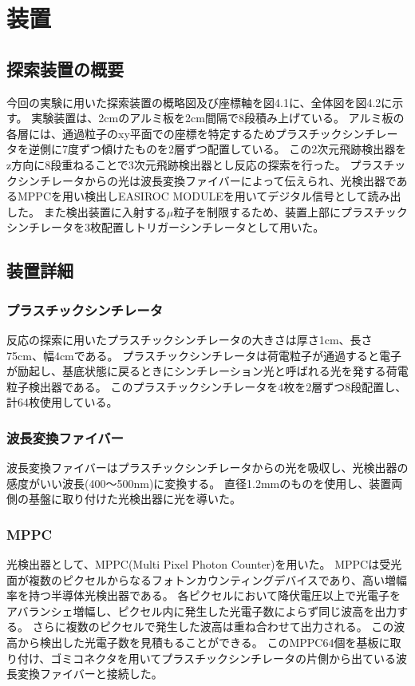 \chapter{装置} \label{equipment}
\section{探索装置の概要}
今回の実験に用いた探索装置の概略図及び座標軸を図4.1に、全体図を図4.2に示す。
実験装置は、2cmのアルミ板を2cm間隔で8段積み上げている。
アルミ板の各層には、通過粒子のxy平面での座標を特定するためプラスチックシンチレータを逆側に7度ずつ傾けたものを2層ずつ配置している。
この2次元飛跡検出器をz方向に8段重ねることで3次元飛跡検出器とし反応の探索を行った。
プラスチックシンチレータからの光は波長変換ファイバーによって伝えられ、光検出器であるMPPCを用い検出しEASIROC MODULEを用いてデジタル信号として読み出した。
また検出装置に入射する$\mu$粒子を制限するため、装置上部にプラスチックシンチレータを3枚配置しトリガーシンチレータとして用いた。

\section{装置詳細}
\subsection{プラスチックシンチレータ}
反応の探索に用いたプラスチックシンチレータの大きさは厚さ1cm、長さ75cm、幅4cmである。
プラスチックシンチレータは荷電粒子が通過すると電子が励起し、基底状態に戻るときにシンチレーション光と呼ばれる光を発する荷電粒子検出器である。
このプラスチックシンチレータを4枚を2層ずつ8段配置し、計64枚使用している。

\subsection{波長変換ファイバー}
波長変換ファイバーはプラスチックシンチレータからの光を吸収し、光検出器の感度がいい波長(400～500nm)に変換する。
直径1.2mmのものを使用し、装置両側の基盤に取り付けた光検出器に光を導いた。

\subsection{MPPC}
光検出器として、MPPC(Multi Pixel Photon Counter)を用いた。
MPPCは受光面が複数のピクセルからなるフォトンカウンティングデバイスであり、高い増幅率を持つ半導体光検出器である。
各ピクセルにおいて降伏電圧以上で光電子をアバランシェ増幅し、ピクセル内に発生した光電子数によらず同じ波高を出力する。
さらに複数のピクセルで発生した波高は重ね合わせて出力される。
この波高から検出した光電子数を見積もることができる。
このMPPC64個を基板に取り付け、ゴミコネクタを用いてプラスチックシンチレータの片側から出ている波長変換ファイバーと接続した。

